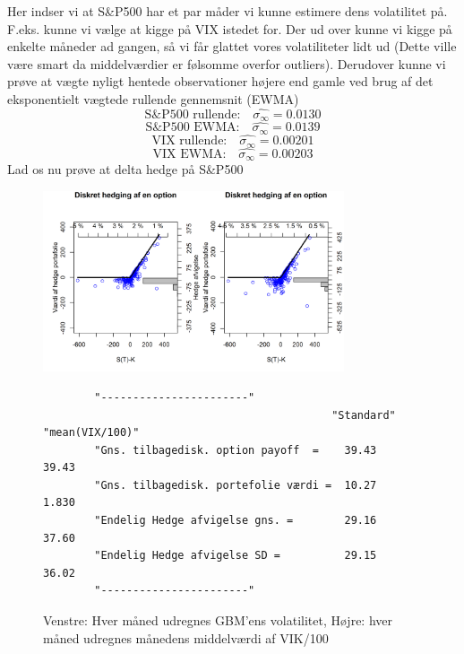 \documentclass{article}
\theoremstyle{definition}
\theoremstyle{remark}
\begin{document}
Her indser vi at S\&P500 har et par måder vi kunne estimere dens volatilitet på. F.eks. kunne vi vælge at kigge på VIX istedet for. Der ud over kunne vi kigge på enkelte måneder ad gangen, så vi får glattet vores volatiliteter lidt ud (Dette ville være smart da middelværdier er følsomme overfor outliers). Derudover kunne vi prøve at vægte nyligt hentede observationer højere end gamle ved brug af det eksponentielt vægtede rullende gennemsnit (EWMA)
$$\text{S\&P500 rullende:}\quad\hat{\sigma_{\infty}}=0.0130$$
$$\text{S\&P500 EWMA:}\quad\hat{\sigma_{\infty}}=0.0139$$
$$\text{VIX rullende:}\quad\hat{\sigma_{\infty}}=0.00201$$
$$\text{VIX EWMA:}\quad\hat{\sigma_{\infty}}=0.00203$$
Lad os nu prøve at delta hedge på S\&P500
\begin{figure}
    \centering
    \includegraphics[width=3.5in]{Overleaf/option_call_monthlyGBM_meanVIX100}
    \caption{Venstre: Hver måned udregnes GBM'ens volatilitet, Højre: hver måned udregnes månedens middelværdi af VIK/100}
    \begin{verbatim}
        "-----------------------"                         
                                             "Standard"   "mean(VIX/100)"
        "Gns. tilbagedisk. option payoff  =    39.43          39.43
        "Gns. tilbagedisk. portefolie værdi =  10.27          1.830
        "Endelig Hedge afvigelse gns. =        29.16          37.60
        "Endelig Hedge afvigelse SD =          29.15          36.02
        "-----------------------"
    \end{verbatim}
    \label{fig:standard}
\end{figure}
\end{document}
